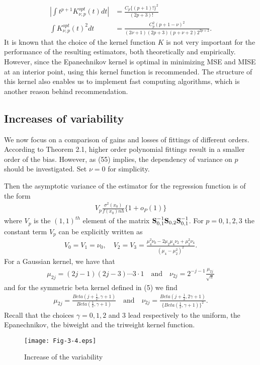\documentclass[12pt]{article}
\renewcommand{\=}[1]{\stackrel{#1}{=}} %
\theoremstyle{definition}
\begin{document}
	\begin{align}
	\left|\int t^{p+1}K_{\nu,p}^{opt}(t)dt\right|&=\frac{C_p\{(p+1)!\}^2}{(2p+3)!}\\
	\int K_{\nu,p}^{opt}(t)^2dt&=\frac{C_p^2(p+1-\nu)^2}{(2\nu+1)(2p+3)(p+\nu+2)2^{2p+2}}.
	\end{align}
	It is known that the choice of the kernel function $K$ is not very important for the performance of the resulting estimators, both theoretically and empirically. However, since the Epanechnikov kernel is optimal in minimizing MSE and MISE at an interior point, using this kernel function is recommended. The structure of this kernel also enables us to implement fast computing algorithms, which is another reason behind recommendation. 

\subsection{Increases of variability}
	We now focus on a comparison of gains and losses of fittings of different orders. According to Theorem 2.1, higher order polynomial fittings result in a smaller order of the bias. However, as (55) implies, the dependency of variance on $p$ should be investigated. Set $\nu=0$ for simplicity.
	
	Then the asymptotic variance of the estimator for the regression function is of the form
	\begin{align}
	V_p\frac{\sigma^2(x_0)}{f(x_0)nh}\{1+o_P(1)\}
	\end{align}
	where $V_p$ is the $(1,1)^{th}$ element of the matrix $\bf S_{\rm0,1}^{\rm-1}\bf S_{\rm0,2}\bf S_{\rm0,1}^{\rm-1}$. For $p=0,1,2,3$ the constant term $V_p$ can be explicitly written as
	\begin{align}
	V_0=V_1=\nu_0,\quad V_2=V_3=\frac{\mu_4^2\nu_0-2\mu_2\mu_4\nu_2+\mu_2^2\nu_4}{(\mu_4-\mu_2^2)^2}.
	\end{align}
	For a Gaussian kernel, we have that
	\begin{align}
	\mu_{2j}=(2j-1)(2j-3)\cdots3\cdot1\quad\text{and}\quad\nu_{2j}=2^{-j-1}\frac{\mu_{2j}}{\sqrt{\pi}}
	\end{align}
	and for the symmetric beta kernel defined in (5) we find
	\begin{align}
	\mu_{2j}=\frac{Beta(j+\frac{1}{2},\gamma+1)}{Beta(\frac{1}{2},\gamma+1)}\quad\text{and}\quad\nu_{2j}=\frac{Beta(j+\frac{1}{2},2\gamma+1)}{\{Beta(\frac{1}{2},\gamma+1)\}^2}.
	\end{align}
	Recall that the choices $\gamma=0,1,2$ and $3$ lead respectively to the uniform, the Epanechnikov, the biweight and the triweight kernel function.
	\begin{figure}
		\caption{Increase of the variability}
		\centering
		\texttt{[image: Fig-3-4.eps]}	
	\end{figure}
\end{document}
